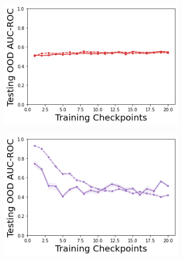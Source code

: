 \begin{figure}
    \begin{subfigure}{.24\textwidth}
        \includegraphics[width=\textwidth]{sections/011_icml2022/resources/DropOut-CartPoleOOD-v0-AUC-ROC-epistemic_-testing-strategy.png}
    \end{subfigure}
    \begin{subfigure}{.24\textwidth}
        \includegraphics[width=\textwidth]{sections/011_icml2022/resources/Ensemble-CartPoleOOD-v0-AUC-ROC-epistemic_-testing-strategy.png}
    \end{subfigure}
    \begin{subfigure}{.24\textwidth}

\end{subfigure}
\end{figure}
